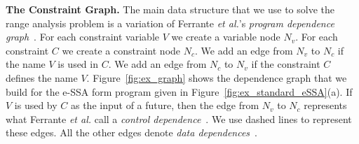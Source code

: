 \documentclass[preprint]{elsarticle}
\begin{document}
%

\noindent
\textbf{The Constraint Graph.}
The main data structure that we use to solve the range analysis problem is
a variation of Ferrante {\em et al.}'s {\em program dependence
graph}~\cite{Ferrante87}.
For each constraint variable $V$ we create a variable node $N_v$.
For each constraint $C$ we create a constraint node $N_c$.
We add an edge from $N_v$ to $N_c$ if the name $V$ is used in $C$.
We add an edge from $N_c$ to $N_v$ if the constraint $C$ defines the name
$V$.
Figure~\ref{fig:ex_graph} shows the dependence graph that we build for the
e-SSA form program given in Figure~\ref{fig:ex_standard_eSSA}(a).
If $V$ is used by $C$ as the input of a future, then the edge from
$N_v$ to $N_c$ represents what Ferrante {\em et al.} call a {\em control
dependence}~\cite[p.323]{Ferrante87}.
We use dashed lines to represent these edges.
All the other edges denote {\em data dependences}~\cite[p.322]{Ferrante87}.
\end{document}
